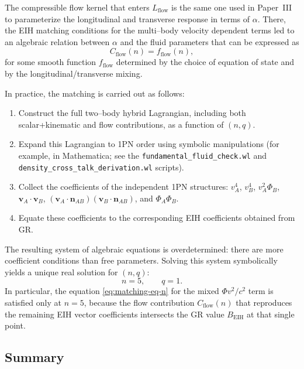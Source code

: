 \documentclass[11pt]{article}
\begin{document}
The compressible flow kernel that enters \(L_{\text{flow}}\) is the same
one used in Paper~III to parameterize the longitudinal and transverse
response in terms of \(\alpha\).  There, the EIH matching conditions for
the multi--body velocity dependent terms led to an algebraic relation
between \(\alpha\) and the fluid parameters that can be expressed as
\begin{equation}
  C_{\text{flow}}(n)
  = f_{\text{flow}}(n),
  \label{eq:Cflow-function}
\end{equation}
for some smooth function \(f_{\text{flow}}\) determined by the choice of
equation of state and by the longitudinal/transverse mixing.

In practice, the matching is carried out as follows:
\begin{enumerate}
  \item Construct the full two--body hybrid Lagrangian, including both
        scalar+kinematic and flow contributions, as a function of
        \((n,q)\).
  \item Expand this Lagrangian to 1PN order using symbolic manipulations
        (for example, in Mathematica; see the \texttt{fundamental\_fluid\_check.wl}
        and \texttt{density\_cross\_talk\_derivation.wl} scripts).
  \item Collect the coefficients of the independent 1PN structures:
        \(v_A^4\), \(v_B^4\), \(v_A^2 \Phi_B\),
        \(\mathbf{v}_A \cdot \mathbf{v}_B\),
        \((\mathbf{v}_A \cdot \mathbf{n}_{AB})
          (\mathbf{v}_B \cdot \mathbf{n}_{AB})\),
        and \(\Phi_A \Phi_B\).
  \item Equate these coefficients to the corresponding EIH coefficients
        obtained from GR.
\end{enumerate}
The resulting system of algebraic equations is overdetermined: there are
more coefficient conditions than free parameters.  Solving this system
symbolically yields a unique real solution for \((n,q)\):
\begin{equation}
  n = 5,
  \qquad
  q = 1.
\end{equation}
In particular, the equation \eqref{eq:matching-eq-n} for the mixed
\(\Phi v^2/c^2\) term is satisfied only at \(n = 5\), because the flow
contribution \(C_{\text{flow}}(n)\) that reproduces the remaining EIH
vector coefficients intersects the GR value \(B_{\text{EIH}}\) at that
single point.

\subsection{Summary}
\label{app:1pn-summary}
\end{document}

